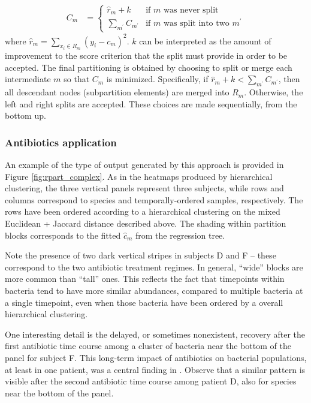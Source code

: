 \documentclass{article}
\begin{document}
\begin{align*}
  C_{m} &= \begin{cases}
    \hat{r}_{m} + k & \text{if $m$ was never split} \\
    \sum_{m^\prime} C_{m^{\prime}} & \text{if $m$ was split into two $m^{\prime}$}
    \end{cases}
\end{align*}
where $\hat{r}_{m} = \sum_{x_{i} \in R_{m}} \left(y_{i} - c_{m}\right)^{2}$. $k$
can be interpreted as the amount of improvement to the score criterion that the
split must provide in order to be accepted. The
final partitioning is obtained by choosing to split or merge each intermediate
$m$ so that $C_{m}$ is minimized. Specifically, if
$\hat{r}_{m} + k < \sum_{m^{\prime}} C_{m^{\prime}}$, then all descendant nodes
(subpartition elements) are merged into $R_{m}$. Otherwise, the left and right
splits are accepted. These choices are made sequentially, from the bottom up.

\subsubsection{Antibiotics application}
\label{subsubsec:antibiotics_application}

An example of the type of output generated by this approach is provided in
Figure \ref{fig:rpart_complex}. As in the heatmaps produced by hierarchical
clustering, the three vertical panels represent three subjects, while rows and
columns correspond to species and temporally-ordered samples, respectively. The
rows have been ordered according to a hierarchical clustering on the mixed
Euclidean + Jaccard distance described above. The shading within partition
blocks corresponds to the fitted $\hat{c}_{m}$ from the regression tree.

Note the presence of two dark vertical stripes in subjects D and F -- these
correspond to the two antibiotic treatment regimes. In general, ``wide'' blocks
are more common than ``tall'' ones. This reflects the fact that timepoints
within bacteria tend to have more similar abundances, compared to multiple
bacteria at a single timepoint, even when those bacteria have been ordered by a
overall hierarchical clustering.

One interesting detail is the delayed, or sometimes nonexistent, recovery after
the first antibiotic time course among a cluster of bacteria near the bottom of
the panel for subject F. This long-term impact of antibiotics on bacterial
populations, at least in one patient, was a central finding in
\citep{dethlefsen2011incomplete}. Observe that a similar pattern is visible after
the second antibiotic time course among patient D, also for species near the
bottom of the panel.
\end{document}
